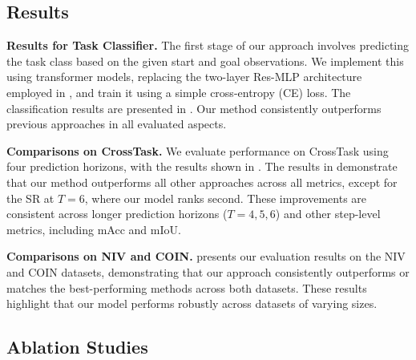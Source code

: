 \subsection{Results}
\label{sec:results}



 



\textbf{Results for Task Classifier.} The first stage of our approach involves predicting the task class based on the given start and goal observations. We implement this using transformer models, replacing the two-layer Res-MLP architecture employed in \citet{wang2023pdpp}, and train it using a simple cross-entropy (CE) loss. The classification results are presented in . Our method consistently outperforms previous approaches in all evaluated aspects.


\textbf{Comparisons on CrossTask.} We evaluate performance on CrossTask using four prediction horizons, with the results shown in . 
The results in  demonstrate that our method outperforms all other approaches across all metrics, except for the SR at $T = 6$, where our model ranks second. These improvements are consistent across longer prediction horizons ($T = 4, 5, 6$) and other step-level metrics, including mAcc and mIoU.


\textbf{Comparisons on NIV and COIN.}  presents our evaluation results on the NIV and COIN datasets, demonstrating that our approach consistently outperforms or matches the best-performing methods across both datasets. 
These results highlight that our model performs robustly across datasets of varying sizes.




\subsection{Ablation Studies} 


